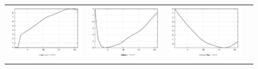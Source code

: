 \begin{figure}
\begin{tabular}{cccc}
\includegraphics[scale=0.22]{results_reinit/Investment_techshock_irf.png} & 
\includegraphics[scale=0.22]{results_reinit/Inflation_techshock_irf.png} & 
\includegraphics[scale=0.22]{results_reinit/Interest_Rate_techshock_irf.png} \\ \\ 

\end{tabular}
\end{figure}
